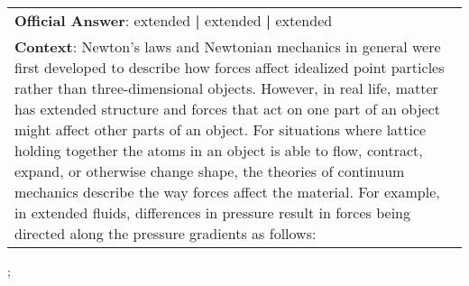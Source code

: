 \begin{figure*}[ht]
{\begin{tabular}{p{}}
            \textbf{Official Answer}: extended \textbf{|} extended \textbf{|} extended                                                                                                                                                                                                                                                                                                                                                                                                                                                                                                                                                                                                            \\
            \textbf{Context}: Newton's laws and Newtonian mechanics in general were first developed to describe how forces affect idealized point particles rather than three-dimensional objects. However, in real life, matter has extended structure and forces that act on one part of an object might affect other parts of an object. For situations where lattice holding together the atoms in an object is able to flow, contract, expand, or otherwise change shape, the theories of continuum mechanics describe the way forces affect the material. For example, in extended fluids, differences in pressure result in forces being directed along the pressure gradients as follows: \\
        \end{tabular}
    };
    \label{fig:ex-5737a0acc3c5551400e51f49}
\end{figure*}


